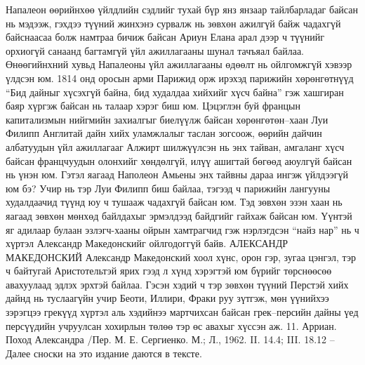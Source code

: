 Напалеон өөрийнхөө үйлдлийн сэдлийг тухай бүр янз янзаар тайлбарладаг байсан нь мэдээж, гэхдээ түүний жинхэнэ сурвалж нь зөвхөн ажилгүй байж чадахгүй байснаасаа болж намтраа бичиж байсан Ариун Елана арал дээр ч түүнийг орхиогүй санаанд багтамгүй үйл ажиллагааны шунал тачъяал байлаа. Өнөөгийнхний хувьд Напалеоны үйл ажиллагааны өдөөлт нь ойлгомжгүй хэвээр үлдсэн юм. 1814 онд оросын арми Парижид орж ирэхэд парижийн хөрөнгөтнүүд “Бид дайныг хүсэхгүй байна, бид худалдаа хийхийг хүсч байна” гэж хашгиран баяр хүргэж байсан нь талаар хэрэг биш юм.
Цэцэглэн буй францын капитализмын нийгмийн захиалгыг биелүүлж байсан хөрөнгөтөн–хаан Луи Филипп Англитай дайн хийх уламжлалыг таслан зогсоож, өөрийн дайчин албатуудын үйл ажиллагааг Алжирт шилжүүлсэн нь энх тайван, амгаланг хүсч байсан францчуудын олонхийг хөндөлгүй, илүү ашигтай бөгөөд аюулгүй байсан нь үнэн юм. Гэтэл яагаад Наполеон Амьены энх тайвны дараа ингэж үйлдээгүй юм бэ? Учир нь тэр Луи Филипп биш байлаа, тэгээд ч парижийн лангууны худалдаачид түүнд юу ч тушааж чадахгүй байсан юм. Тэд зөвхөн эзэн хаан нь яагаад зөвхөн мөнхөд байлдахыг эрмэлдээд байдгийг гайхаж байсан юм. Үүнтэй яг адилаар булаан эзлэгч-хааны ойрын хамтрагчид гэж нэрлэгдсэн “найз нар” нь ч хүртэл Александр Македонскийг ойлгодоггүй байв.
АЛЕКСАНДР МАКЕДОНСКИЙ
Александр Македонский хоол хүнс, орон гэр, зугаа цэнгэл, тэр ч байтугай Аристотельтэй ярих гээд л хүнд хэрэгтэй юм бүрийг төрснөөсөө авахуулаад эдлэх эрхтэй байлаа. Гэсэн хэдий ч тэр зөвхөн түүний Перстэй хийх дайнд нь туслаагүйн учир Беоти, Иллири, Фраки руу зүтгэж, мөн үүнийхээ зэрэгцээ грекүүд хүртэл аль хэдийнээ мартчихсан байсан грек–персийн дайны үед персүүдийн учруулсан хохирлын төлөө тэр өс авахыг хүссэн аж. 11. Арриан. Поход Александра /Пер. М. Е. Сергиенко. М.; Л., 1962. II. 14.4; III. 18.12 – Далее сноски на это издание даются в тексте.
